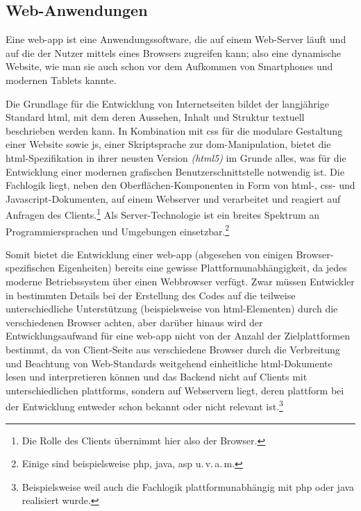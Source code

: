 \subsection{Web-Anwendungen}\label{sec:web-app}

Eine \gls{web-app} ist eine Anwendungssoftware, die auf einem Web-Server läuft und auf die der Nutzer mittels eines Browsers zugreifen kann; also eine dynamische Website, wie man sie auch schon vor dem Aufkommen von Smartphones und modernen Tablets kannte. 

Die Grundlage für die Entwicklung von Internetseiten bildet der langjährige Standard \gls{html}, mit dem deren Aussehen, Inhalt und Struktur textuell beschrieben werden kann. 
In Kombination mit \gls{css} für die modulare Gestaltung einer Website sowie \gls{js}, einer Skriptsprache zur \gls{dom}-Manipulation, bietet die \gls{html}-Spezifikation in ihrer neusten Version \textit{(\gls{html5})} im Grunde alles, was für die Entwicklung einer modernen grafischen Benutzerschnittstelle notwendig ist. 
Die Fachlogik liegt, neben den Oberflächen-Komponenten in Form von \mbox{\gls{html}-,} \gls{css}- und Javascript-Dokumenten, auf einem Webserver und verarbeitet und reagiert auf Anfragen des Clients.\footnote{Die Rolle des Clients übernimmt hier also der Browser.}
Als Server-Technologie ist ein breites Spektrum an Programmiersprachen und Umgebungen einsetzbar.\footnote{Einige sind beispielsweise \gls*{php}, \gls*{java}, \gls*{asp} u.\,v.\,a.\,m.}

Somit bietet die Entwicklung einer \gls{web-app} (abgesehen von einigen Browser-spezifischen Eigenheiten) bereits eine gewisse Plattformunabhängigkeit, da jedes moderne Betriebssystem über einen Webbrowser verfügt. 
Zwar müssen Entwickler in bestimmten Details bei der Erstellung des Codes auf die teilweise unterschiedliche Unterstützung (beispielsweise von \gls{html}-Elementen)  durch die verschiedenen Browser achten, aber darüber hinaus wird der Entwicklungsaufwand für eine \gls{web-app} nicht von der Anzahl der Zielplattformen bestimmt, da von Client-Seite aus verschiedene Browser durch die Verbreitung und Beachtung von Web-Standards weitgehend einheitliche \gls{html}-Dokumente lesen und interpretieren können und das Back\-end nicht auf Clients mit unterschiedlichen \glspl{plattform}, sondern auf Webservern liegt, deren \gls{plattform} bei der Entwicklung entweder schon bekannt oder nicht relevant ist.\footnote{Beispielsweise weil auch die Fachlogik plattformunabhängig mit \gls*{php} oder \gls*{java} realisiert wurde.}

